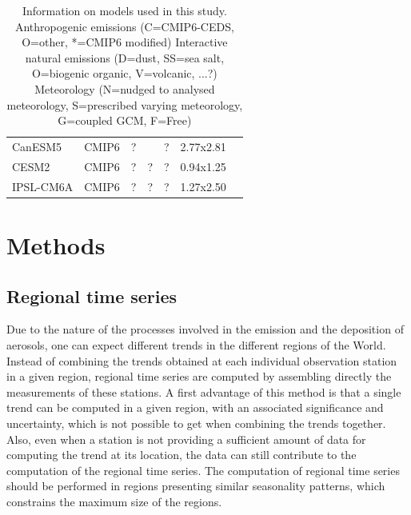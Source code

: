 \documentclass[journal abbreviation, manuscript]{copernicus}
\begin{document}
\begin{table}[]
\begin{tabularx}{\textwidth}{llllllX}
CanESM5    & CMIP6     & ?                             &                         & ?           & 2.77x2.81                   & \cite{gmd-12-4823-2019}                                             \\
CESM2      & CMIP6     & ?                             & ?                       & ?           & 0.94x1.25                   &                                                                      \\
IPSL-CM6A  & CMIP6     & ?                             & ?                       & ?           & 1.27x2.50                   &                                                                      \\ \bottomrule
\end{tabularx}
 \caption{Information on models used in this study. 
  Anthropogenic emissions (C=CMIP6-CEDS, O=other, *=CMIP6 modified)
  Interactive natural emissions (D=dust, SS=sea salt, O=biogenic organic, V=volcanic, ...?)
  Meteorology (N=nudged to analysed meteorology, S=prescribed varying meteorology, G=coupled GCM, F=Free)
  }
 \label{table:models}
\end{table}



\section{Methods}

\subsection{Regional time series}
Due to the nature of the processes involved in the emission and the deposition of aerosols, one can expect different trends in the different regions of the World. Instead of combining the trends obtained at each individual observation station in a given region, regional time series are computed by assembling directly the measurements of these stations. A first advantage of this method is that a single trend can be computed in a given region, with an associated significance and uncertainty, which is not possible to get when combining the trends together. Also, even when a station is not providing a sufficient amount of data for computing the trend at its location, the data can still contribute to the computation of the regional time series. The computation of regional time series should be performed in regions presenting similar seasonality patterns, which constrains the maximum size of the regions.
\end{document}
